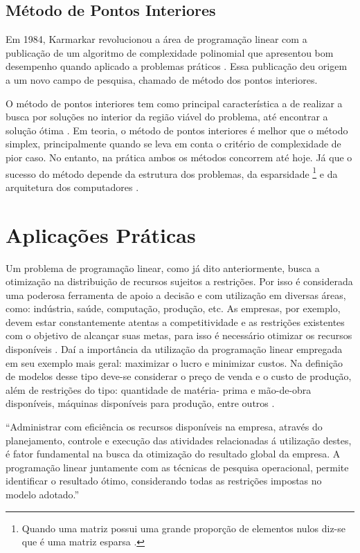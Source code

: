 \subsection{Método de Pontos Interiores}
Em 1984, Karmarkar revolucionou a área de programação linear com a publicação de um algoritmo de complexidade polinomial que apresentou bom desempenho quando aplicado a problemas práticos \cite{MaculanPI}. Essa publicação deu origem a um novo campo de pesquisa, chamado de método dos pontos interiores. 

O método de pontos interiores tem como principal característica a de realizar a busca por soluções no interior da região viável do problema, até encontrar a solução ótima \cite{Pinto}.
Em teoria, o método de pontos interiores é melhor que o método simplex, principalmente quando se leva em conta o critério de complexidade de pior caso. No entanto, na prática ambos os métodos concorrem até hoje. Já que o sucesso do método depende da estrutura dos problemas, da esparsidade \footnote{Quando uma matriz possui uma grande proporção de elementos nulos diz-se que é uma matriz esparsa \cite{Munari}.} e da arquitetura dos computadores \cite{MaculanPI}.

\section{Aplicações Práticas}
Um problema de programação linear, como já dito anteriormente, busca a otimização na distribuição de recursos sujeitos a restrições. Por isso é considerada uma poderosa ferramenta de apoio a decisão \cite{FrossardMaxMin} e com utilização em diversas áreas, como: indústria, saúde, computação, produção, etc.
As empresas, por exemplo, devem estar constantemente atentas a competitividade e as restrições existentes com o objetivo de alcançar suas metas, para isso é necessário otimizar os recursos disponíveis \cite{FrossardMaxMin}. Daí a importância da utilização da programação linear empregada em seu exemplo mais geral: maximizar o lucro e minimizar custos.  Na definição de modelos desse tipo deve-se considerar o preço de venda e o custo de produção, além de restrições do tipo: quantidade de matéria- prima e mão-de-obra disponíveis, máquinas disponíveis para produção, entre outros \cite{FrossardMaxMin}.

\begin{citacao}
“Administrar com eficiência os recursos disponíveis na empresa, através do planejamento, controle e execução das atividades relacionadas á utilização destes, é fator fundamental na busca da otimização do resultado global da empresa. A programação linear juntamente com as técnicas de pesquisa operacional, permite identificar o resultado ótimo, considerando todas as restrições impostas no modelo adotado.” \cite[p.~31]{FrossardMaxMin}
\end{citacao}

